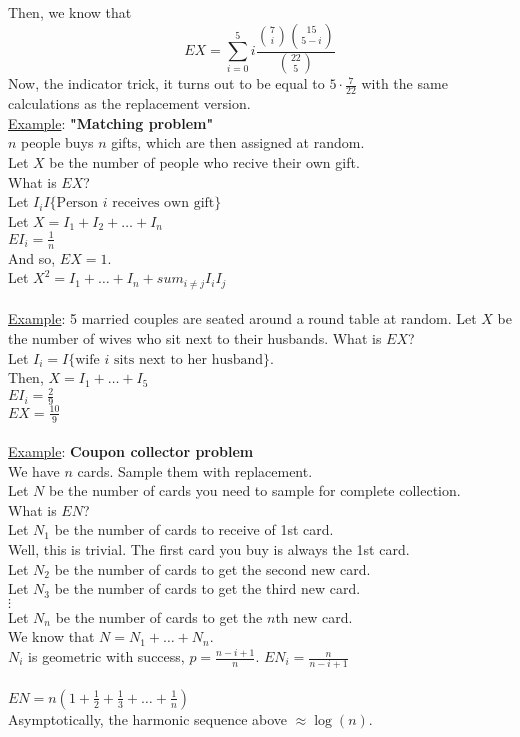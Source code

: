    Then, we know that 
   $$
    EX = \sum_{i = 0}^5 i \frac{\binom{7}{i}\binom{15}{5-i}}{\binom{22}{5}}
   $$
   Now, the indicator trick, it turns out to be equal to $5 \cdot 
   \frac{7}{22}$ with the same calculations as the replacement version.\\
    \underline{Example}:
      {\bf "Matching problem"}\\
      $n$ people buys $n$ gifts, which are then assigned at random.\\
      Let $X$ be the number of people who recive their own gift.\\
      What is $EX$?\\
      Let $I_i  I\{\text{Person $i$ receives own gift}\}$\\
      Let $X = I_1 + I_2 + \ldots + I_n$\\
      $EI_i = \frac{1}{n}$\\
      And so, $EX = 1$.\\
      Let $X^2 = I_1 + \ldots + I_n + sum_{i \not= j} I_i I_j$\\\\
    \underline{Example}:
      5 married couples are seated around a round table at random. Let $X$ be
      the number of wives who sit next to their husbands. What is $EX$?\\
      Let $I_i = I\{\text{wife $i$ sits next to her husband}\}$.\\
      Then, $X = I_1 + \ldots + I_5$\\
      $EI_i = \frac{2}{9}$\\
      $EX = \frac{10}{9}$\\\\
    \underline{Example}: {\bf Coupon collector problem}\\
      We have $n$ cards. Sample them with replacement.\\
      Let $N$ be the number of cards you need to sample for complete
      collection.\\
      What is $EN$?\\
      Let $N_1$ be the number of cards to receive of 1st card.\\
      Well, this is trivial. The first card you buy is always the 1st card.\\
      Let $N_2$ be the number of cards to get the second new card.\\
      Let $N_3$ be the number of cards to get the third new card.\\
      $\vdots$\\
      Let $N_n$ be the number of cards to get the $n$th new card.\\
      We know that $N = N_1 + \ldots + N_n$.\\
      $N_i$ is geometric with success, $p = \frac{n-i + 1}{n}$.
      $EN_i = \frac{n}{n-i+1}$\\\\
      $EN = n(1 + \frac{1}{2} + \frac{1}{3} + \ldots + \frac{1}{n})$\\
      Asymptotically, the harmonic sequence above $\approx \log(n)$.
